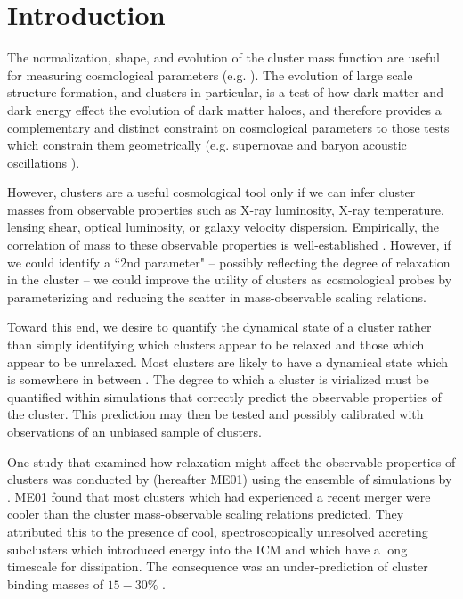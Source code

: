 \documentclass{emulateapj}
\begin{document}
\section{Introduction}\label{sec:intro}

The normalization, shape, and evolution of the cluster mass function
are useful for measuring cosmological parameters
(e.g. \citealt{1989ApJ...341L..71E, 1998ApJ...508..483W,
2001ApJ...553..545H,  2004PhRvD..70l3008W}). The evolution of large
scale structure formation, and clusters in particular, is a test of
how dark matter and dark energy effect the evolution of dark
matter haloes, and therefore provides a complementary and distinct
constraint on cosmological parameters to those tests which constrain
them geometrically (e.g. supernovae \citealt{1998AJ....116.1009R,
2007ApJ...659...98R} and baryon acoustic oscillations
\citealt{2005ApJ...633..560E}).

However, clusters are a useful cosmological tool only if we can infer
cluster masses from observable properties such as X-ray luminosity,
X-ray temperature, lensing shear, optical luminosity, or galaxy
velocity dispersion. Empirically, the correlation of mass to these
observable properties is well-established
\citep{2005RvMP...77..207V}. However, if we could identify a ``2nd
parameter" -- possibly reflecting the degree of relaxation in the
cluster -- we could improve the utility of clusters as cosmological
probes by parameterizing and reducing the scatter in mass-observable
scaling relations.

Toward this end, we desire to quantify the dynamical state of a
cluster rather than simply identifying which clusters appear to be
relaxed and those which appear to be unrelaxed. Most clusters are
likely to have a dynamical state which is somewhere in between
\citep{2006ApJ...639...64O, 2006ApJ...650..128K}. The degree to which
a cluster is virialized must be quantified within simulations that
correctly predict the observable properties of the cluster. This
prediction may then be tested and possibly calibrated with
observations of an unbiased sample of clusters.

One study that examined how relaxation might affect the observable
properties of clusters was conducted by \citealt{2001ApJ...546..100M}
(hereafter ME01) using the ensemble of simulations by
\citealt{1997ApJ...491...38M}. ME01 found that most clusters which had
experienced a recent merger were cooler than the cluster
mass-observable scaling relations predicted. They attributed this to the
presence of cool, spectroscopically unresolved accreting subclusters
which introduced energy into the ICM and which have a long timescale for
dissipation. The consequence was an under-prediction of cluster
binding masses of $15-30\%$ \citep{2001ApJ...546..100M}.
\end{document}
